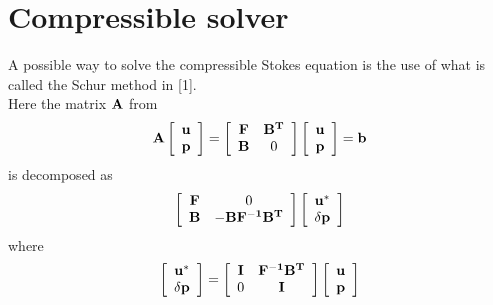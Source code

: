\section{Compressible solver}

A possible way to solve the compressible Stokes equation is the use of what is called the Schur method in [1]. \\
Here the matrix $\bf A$ from 
\begin{equation} \label{saddle}
\bf{A}\left[ \begin{array}{c}
       \bf{u} \\
	\bf{p}\\	
        \end{array}
\right]=
 \left[ \begin{array}{cc}
	\bf{F} & \bf{B^{T}} \\
	\bf{B} & 0 
        \end{array}
\right]
\left[ \begin{array}{c}
       \bf{u} \\
	\bf{p}\\	
        \end{array}
\right]
= \bf{b}
\end{equation}
is decomposed as
\begin{equation}
 \left[ \begin{array}{cc}
	\bf{F} & 0 \\
	\bf{B} &  \bf{-B F^{-1} B^{T}}
        \end{array}
\right]
\left[ \begin{array}{c}
       \bf{u^{*}} \\
	\bf{\delta p}\\	
        \end{array}
\right]
\end{equation}
where 
\begin{equation}
\left[ \begin{array}{c}
       \bf{u^{*}} \\
	\bf{\delta p}\\	
        \end{array}
\right]
=
\left[ \begin{array}{cc}
	\bf{I} & \bf{F^{-1}B^{T}}\\
	0 & \bf{I} \\
        \end{array}
\right]
\left[ \begin{array}{c}
       \bf{u} \\
	\bf{p}\\	
        \end{array}
\right]
\end{equation}


